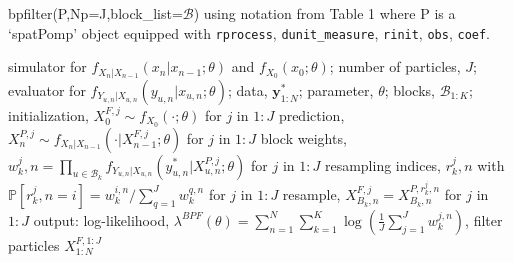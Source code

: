 \documentclass{article}
\begin{document}
\begin{algorithm}
\caption{bpfilter(P,Np=J,block\_list=$\mathcal{B}$) using notation from Table 1 where P is a ‘spatPomp’ object equipped with \texttt{rprocess}, \texttt{dunit\_measure}, \texttt{rinit}, \texttt{obs}, \texttt{coef}.}
\begin{algorithmic}[1]
\REQUIRE simulator for $f_{X_n|X_{n-1}}(x_n | x_{n-1}; \theta)$ and $f_{X_0}(x_0; \theta)$; number of particles, $J$; evaluator for $f_{Y_{u,n}|X_{u,n}}(y_{u,n} | x_{u,n}; \theta)$; data, $\mathbf{y}_{1:N}^*$; parameter, $\theta$; blocks, $\mathcal{B}_{1:K}$;
\STATE initialization, $X_0^{F,j} \sim f_{X_0}(\cdot; \theta)$ for $j$ in $1:J$
    \STATE prediction, $X_n^{P,j} \sim f_{X_n|X_{n-1}}(\cdot | X_{n-1}^{F,j}; \theta)$ for $j$ in $1:J$
        \STATE block weights, $w_k^j,n = \prod_{u \in \mathcal{B}_k} f_{Y_{u,n}|X_{u,n}}(y_{u,n}^* | X_{u,n}^{P,j}; \theta)$ for $j$ in $1:J$
        \STATE resampling indices, $r_k^j,n$ with $\mathbb{P}\left[r_k^j,n = i\right] = w_k^{i,n}/\sum_{q=1}^J w_k^{q,n}$ for $j$ in $1:J$
        \STATE resample, $X_{B_k,n}^{F,j} = X_{B_k,n}^{P,r_k^j,n}$ for $j$ in $1:J$
    \ENDFOR
\ENDFOR
\ENSURE output: log-likelihood, $\lambda^{BPF}(\theta) = \sum_{n=1}^N \sum_{k=1}^K \log\left(\frac{1}{J} \sum_{j=1}^J w_k^{j,n}\right)$, filter particles $X_{1:N}^{F,1:J}$
\end{algorithmic}
\end{algorithm}
\end{document}
